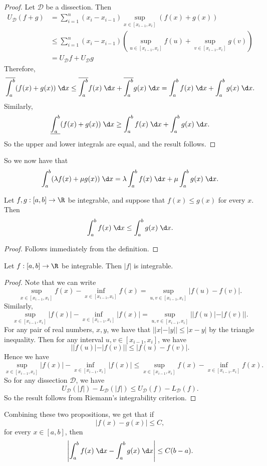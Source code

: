 \documentclass[a4paper]{article}
\begin{document}
\begin{proof}
  Let $\mathcal{D}$ be a dissection. Then
  \begin{align*}
    U_\mathcal{D}(f + g) &= \sum_{i = 1}^n (x_i - x_{i - 1})\sup_{x\in [x_{i - 1}, x_i]}(f(x) + g(x))\\
    &\leq \sum_{i = 1}^n (x_i - x_{i - 1}) \left(\sup_{u\in [x_{i - 1}, x_i]}f(u) + \sup_{v\in [x_{i - 1}, x_i]}g(v)\right)\\
    &= U_\mathcal{D}f + U_\mathcal{D} g
  \end{align*}
  Therefore,
  \[
    \overline{\int_a^b}(f(x) + g(x))\;\d x \leq \overline{\int_a^b} f(x)\;\d x + \overline{\int_a^b} g(x)\;\d x = \int_a^b f(x)\;\d x + \int_a^bg(x)\;\d x.
  \]
  Similarly,
  \[
  \underline{\int_a^b}(f(x) + g(x))\;\d x \geq \int_a^b f(x)\;\d x + \int_a^b g(x)\;\d x.
  \]
  So the upper and lower integrals are equal, and the result follows.
\end{proof}
So we now have that
\[
  \int_a^b (\lambda f(x) + \mu g(x))\;\d x = \lambda\int_a^b f(x)\;\d x + \mu\int_a^bg(x)\;\d x.
\]

\begin{prop}
  Let $f, g: [a, b] \to \R$ be integrable, and suppose that $f(x) \leq g(x)$ for every $x$. Then
  \[
    \int_a^b f(x)\;\d x \leq \int_a^b g(x)\;\d x.
  \]
\end{prop}

\begin{proof}
  Follows immediately from the definition.
\end{proof}

\begin{prop}
  Let $f: [a, b] \to \R$ be integrable. Then $|f|$ is integrable.
\end{prop}

\begin{proof}
  Note that we can write
  \[
    \sup_{x\in [x_{i - 1}, x_i]}f(x) - \inf_{x\in [x_{i - 1}, x_i]}f(x) = \sup_{u, v\in [x_{i - 1}, x_i]}|f(u) - f(v)|.
  \]
  Similarly,
  \[
    \sup_{x\in [x_{i - 1}, x_i]}|f(x)| - \inf_{x\in [x_{i - 1}, x_i]}|f(x)| = \sup_{u, v\in [x_{i - 1}, x_i]}||f(u)| - |f(v)||.
  \]
  For any pair of real numbers, $x, y$, we have that $||x| - |y|| \leq |x - y|$ by the triangle inequality. Then for any interval $u, v\in [x_{i - 1}, x_i]$, we have
  \[
    ||f(u)| - |f(v)|| \leq |f(u) - f(v)|.
  \]
  Hence we have
  \[
    \sup_{x\in [x_{i - 1}, x_i]}|f(x)| - \inf_{x\in [x_{i - 1}, x_i]}|f(x)| \leq \sup_{x\in [x_{i - 1}, x_i]}f(x) - \inf_{x\in [x_{i - 1}, x_i]} f(x).
  \]
  So for any dissection $\mathcal{D}$, we have
  \[
    U_\mathcal{D} (|f|) - L_\mathcal{D}(|f|) \leq U_\mathcal{D}(f) - L_\mathcal{D}(f).
  \]
  So the result follows from Riemann's integrability criterion.
\end{proof}
\note Combining these two propositions, we get that if
\[
  |f(x) - g(x)| \leq C,
\]
for every $x\in[a, b]$, then
\[
  \left|\int_a^bf(x)\;\d x - \int_a^b g(x)\;\d x\right| \leq C(b - a).
\]
\end{document}
